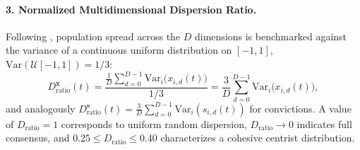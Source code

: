 \documentclass{article}
\begin{document}
\paragraph{3. Normalized Multidimensional Dispersion Ratio.}
Following \citet{bramson2016disambiguation}, population spread across the $D$ dimensions is benchmarked against the variance of a continuous uniform distribution on $[-1, 1]$, $\mathrm{Var}(\mathcal{U}[-1, 1]) = 1/3$:
\begin{equation}
    D_{\mathrm{ratio}}^{\mathbf{x}}(t) = \frac{\frac{1}{D}\sum_{d=0}^{D-1} \mathrm{Var}_i\!\big(x_{i,d}(t)\big)}{1/3} = \frac{3}{D}\sum_{d=0}^{D-1} \mathrm{Var}_i\!\big(x_{i,d}(t)\big),
    \label{eq:dispersion_ratio}
\end{equation}
and analogously $D_{\mathrm{ratio}}^{\mathbf{s}}(t) = \frac{3}{D}\sum_{d=0}^{D-1} \mathrm{Var}_i(s_{i,d}(t))$ for convictions. A value of $D_{\mathrm{ratio}} = 1$ corresponds to uniform random dispersion, $D_{\mathrm{ratio}} \to 0$ indicates full consensus, and $0.25 \le D_{\mathrm{ratio}} \le 0.40$ characterizes a cohesive centrist distribution.
\end{document}
